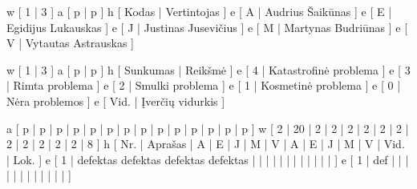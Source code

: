 \xtableu
{
  w [ 1 | 3 ]
  a [ p | p ]
  h [ Kodas | Vertintojas ]
  e [ A | Audrius Šaikūnas ]
  e [ E | Egidijus Lukauskas ]
  e [ J | Justinas Jusevičius ]
  e [ M | Martynas Budriūnas ]
  e [ V | Vytautas Astrauskas ]
}

\xtableu
{
  w [ 1 | 3 ]
  a [ p | p ]
  h [ Sunkumas | Reikšmė ]
  e [ 4 | Katastrofinė problema ]
  e [ 3 | Rimta problema ]
  e [ 2 | Smulki problema ]
  e [ 1 | Kosmetinė problema ]
  e [ 0 | Nėra problemos ]
  e [ Vid. | Įverčių vidurkis ]
}

\xtableu
{
  a [ p   | p       | p | p | p | p | p | p | p | p | p | p | p    | p ]
  w [ 2   | 20      | 2 | 2 | 2 | 2 | 2 | 2 | 2 | 2 | 2 | 2 | 2    | 8 ]
  h [ Nr. | Aprašas | A | E | J | M | V | A | E | J | M | V | Vid. | Lok. ]
  e [ 1   | defektas defektas defektas defektas  
                    |   |   |   |   |   |   |   |   |   |   |      |      ]
  e [ 1   | def     
                    |   |   |   |   |   |   |   |   |   |   |      |      ]
}
